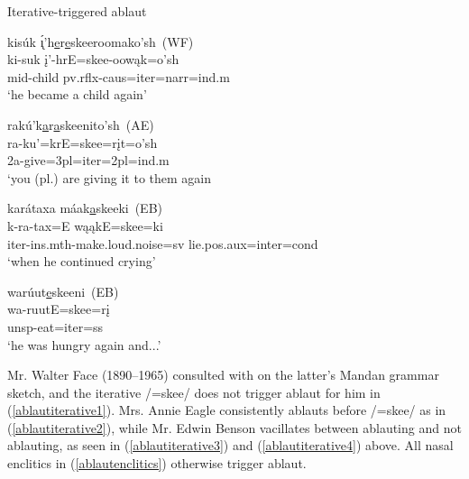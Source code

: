 \begin{exe}
\item\label{ablautiterative} Iterative-triggered ablaut

	\begin{xlist}

	\item\label{ablautiterative1}
	\glll kisúk  \'{ı̨}'h\uline{e}r\uline{e}skeeroomako'sh~\textnormal{(WF)}\\
	ki-suk į'-hrE=skee-oowąk=o'sh\\
	mid-\textnormal{child} pv.rflx-caus=iter=narr=ind.m\\
	\glt `he became a child again' \citep[150]{hollow1973b}

	\item\label{ablautiterative2}
	\glll rakú'k\uline{a}r\uline{a}skeenito'sh~\textnormal{(AE)}\\
	ra-ku'=krE=skee=rįt=o'sh\\
	2a-\textnormal{give}=3pl=iter=2pl=ind.m\\
	\glt `you (pl.) are giving it to them again \citep[453]{hollow1970}

	\item\label{ablautiterative3}
	\glll karátaxa máak\uline{a}skeeki~\textnormal{(EB)}\\
	k-ra-tax=E wąąkE=skee=ki\\
	iter-ins.mth-\textnormal{make.loud.noise}=sv \textnormal{lie}.pos.aux=inter=cond\\
	\glt `when he continued crying' \citep[244]{trechter2012b}

	\item\label{ablautiterative4}
	\glll warúut\uline{e}skeeni~\textnormal{(EB)}\\
	wa-ruutE=skee=rį\\
	unsp-\textnormal{eat}=iter=ss\\
	\glt `he was hungry again and...' \citep[101]{trechter2012b}

	\end{xlist}

\end{exe}

Mr. Walter Face (1890--1965) consulted with \citet{kennard1936} on the latter's Mandan grammar sketch, and the iterative /=skee/ does not trigger ablaut for him in (\ref{ablautiterative1}). Mrs. Annie Eagle consistently ablauts before /=skee/ as in (\ref{ablautiterative2}), while Mr. Edwin Benson vacillates between ablauting and not ablauting, as seen in (\ref{ablautiterative3}) and (\ref{ablautiterative4}) above. All nasal enclitics in (\ref{ablautenclitics}) otherwise trigger ablaut.

